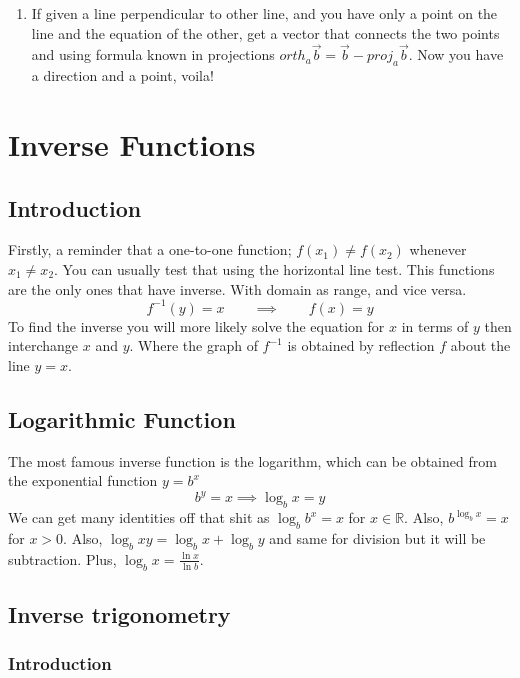\documentclass{article}
\begin{document}
\begin{enumerate}[1.]
	\item If given a line perpendicular to other line, and you have only a point on the line and the equation of the other, get a vector that connects the two points and using formula known in projections  
		$	orth_a \vec{ b } = \vec{ b } - proj_a \vec{ b }$. Now you have a direction and a point, voila!


\end{enumerate}


\newpage

\section{Inverse Functions}

\subsection{Introduction}

Firstly, a reminder that a one-to-one function; $f(x_1) \neq f(x_2)$ whenever $ x_1 \neq x_2 $.
You can usually test that using the horizontal line test.
This functions are the only ones that have inverse. 
With domain as range, and vice versa.
\[
	f^{-1}(y)=x \qquad \implies \qquad  f(x)=y
\]
To find the inverse you will more likely solve the equation for $x$ in terms of $ y $ then interchange $ x $ and $ y $.
Where the graph of $ f^{-1} $ is obtained by reflection $f$ about  the line $y=x$.

\subsection{Logarithmic Function}

The most famous inverse function is the logarithm, which can be obtained from the exponential function $y=b^x$
\[
	b^y=x \implies \log_bx=y
\]
We can get many identities off that shit as $ \log_b{b^x}=x$ for $x \in \mathbb{R}$. Also, $b^{\log_b{x}}=x$ for $x>0$. Also, $\log_b{xy}=\log_bx+\log_by$ and same for division but it will be subtraction. Plus, $\log_b{x}= \frac{ \ln{x} }{ \ln{b} }.$

\subsection{Inverse trigonometry}

\subsubsection{Introduction}
\end{document}
